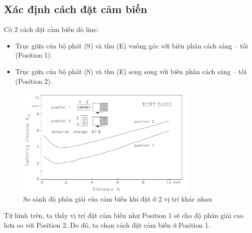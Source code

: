         \subsection{Xác định cách đặt cảm biến}
            \hspace*{0.6cm}Có 2 cách đặt cảm biến dò line:
            \begin{itemize}
                \item Trục giữa của bộ phát (S) và thu (E) vuông góc với biên phân cách sáng – tối (Position 1).
                \item Trục giữa của bộ phát (S) và thu (E) song song với biên phân cách sáng – tối (Position 2).
            \end{itemize}
            \begin{figure}[H]
                \centering
                \includegraphics[width=0.8\textwidth]{pictures/chapter4/c4_p6_SensorPosition.png}
                \caption{So sánh độ phân giải của cảm biến khi đặt ở 2 vị trí khác nhau}
                \label{fig:4-8}
            \end{figure}
            \hspace*{0.6cm}Từ hình trên, ta thấy vị trí đặt cảm biến như Position 1 sẽ cho độ phân giải cao hơn so với Position 2. Do đó, ta chọn cách đặt cảm biến ở Position 1.
